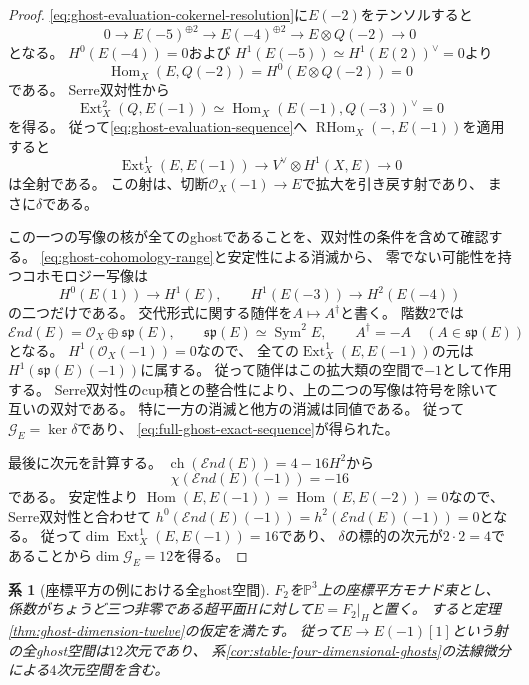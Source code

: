 \documentclass[a4paper,11pt]{ltjsarticle}
\numberwithin{equation}{section}
\theoremstyle{plain}
\newtheorem{corollary}[theorem]{系}
\theoremstyle{definition}
\theoremstyle{remark}
\begin{document}
\begin{proof}
\eqref{eq:ghost-evaluation-cokernel-resolution}に$E(-2)$をテンソルすると
\[
 0\longrightarrow E(-5)^{\oplus2}
 \longrightarrow E(-4)^{\oplus2}
 \longrightarrow E\otimes Q(-2)\longrightarrow0
\]
となる。
$H^0(E(-4))=0$および
$H^1(E(-5))\simeq H^1(E(2))^\vee=0$より
\[
 \operatorname{Hom}_X(E,Q(-2))
 =H^0(E\otimes Q(-2))=0
\]
である。
Serre双対性から
\[
 \operatorname{Ext}^2_X(Q,E(-1))
 \simeq\operatorname{Hom}_X(E(-1),Q(-3))^\vee
 =0
\]
を得る。
従って\eqref{eq:ghost-evaluation-sequence}へ
$\operatorname{RHom}_X(-,E(-1))$を適用すると
\[
 \operatorname{Ext}^1_X(E,E(-1))
 \longrightarrow
 V^\vee\otimes H^1(X,E)
 \longrightarrow0
\]
は全射である。
この射は、切断$\mathcal O_X(-1)\to E$で拡大を引き戻す射であり、
まさに$\delta$である。

この一つの写像の核が全てのghostであることを、双対性の条件を含めて確認する。
\eqref{eq:ghost-cohomology-range}と安定性による消滅から、
零でない可能性を持つコホモロジー写像は
\[
 H^0(E(1))\longrightarrow H^1(E),\qquad
 H^1(E(-3))\longrightarrow H^2(E(-4))
\]
の二つだけである。
交代形式に関する随伴を$A\mapsto A^\dagger$と書く。
階数$2$では
\[
 \mathcal E nd(E)=\mathcal O_X\oplus\mathfrak{sp}(E),
 \qquad \mathfrak{sp}(E)\simeq\operatorname{Sym}^2E,
 \qquad A^\dagger=-A\quad(A\in\mathfrak{sp}(E))
\]
となる。
$H^1(\mathcal O_X(-1))=0$なので、
全ての$\operatorname{Ext}^1_X(E,E(-1))$の元は
$H^1(\mathfrak{sp}(E)(-1))$に属する。
従って随伴はこの拡大類の空間で$-1$として作用する。
Serre双対性のcup積との整合性により、上の二つの写像は符号を除いて互いの双対である。
特に一方の消滅と他方の消滅は同値である。
従って$\mathcal G_E=\ker\delta$であり、
\eqref{eq:full-ghost-exact-sequence}が得られた。

最後に次元を計算する。
$\operatorname{ch}(\mathcal E nd(E))=4-16H^2$から
\[
 \chi(\mathcal E nd(E)(-1))=-16
\]
である。
安定性より
$\operatorname{Hom}(E,E(-1))=\operatorname{Hom}(E,E(-2))=0$なので、
Serre双対性と合わせて
$h^0(\mathcal E nd(E)(-1))=h^2(\mathcal E nd(E)(-1))=0$となる。
従って$\dim\operatorname{Ext}^1_X(E,E(-1))=16$であり、
$\delta$の標的の次元が$2\cdot2=4$であることから$\dim\mathcal G_E=12$を得る。
\end{proof}

\begin{corollary}[座標平方の例における全ghost空間]
\label{cor:coordinate-square-full-ghosts}
$F_2$を$\mathbb P^3$上の座標平方モナド束とし、
係数がちょうど三つ非零である超平面$H$に対して$E=F_2|_H$と置く。
すると定理\ref{thm:ghost-dimension-twelve}の仮定を満たす。
従って$E\to E(-1)[1]$という射の全ghost空間は$12$次元であり、
系\ref{cor:stable-four-dimensional-ghosts}の法線微分による$4$次元空間を含む。
\end{corollary}
\end{document}

